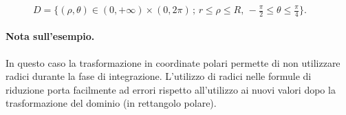 \begin{example}
\begin{figure}[ht]
		\caption{$D=\{(\rho, \theta)\in(0,+\infty)\times(0,2\pi)\,;\, r\leq \rho\leq R,\, -\frac{\pi}{2}\leq \theta\leq \frac{\pi}{4}\}$.}
		\label{fig:dominio_esempio_trasformazione_coordinate}
	\end{figure}
\end{example}
\paragraph{Nota sull'esempio.} In questo caso la trasformazione in coordinate polari permette di non utilizzare radici durante la fase di integrazione. L'utilizzo di radici nelle formule di riduzione porta facilmente ad errori rispetto all'utilizzo ai nuovi valori dopo la trasformazione del dominio (in rettangolo polare).

